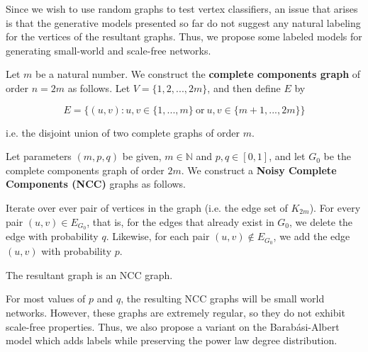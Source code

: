 Since we wish to use random graphs to test vertex classifiers, an issue that
arises is that the generative models presented so far do not suggest any natural
labeling for the vertices of the resultant graphs. Thus, we propose some labeled
models for generating small-world and scale-free networks.

\begin{definition}
  Let $m$ be a natural number. We construct the \textbf{complete components
    graph} of order $n = 2m$ as follows. Let $V = \{1,2, ..., 2m\}$, and then define
  $E$ by

  \[
    E = \{ (u,v) : u,v \in \{1,...,m\} ~\text{or}~ u,v \in \{m+1,...,2m\} \}
  \]

  i.e. the disjoint union of two complete graphs of order $m$.
\end{definition}

\begin{definition}
  Let parameters $(m,p,q)$ be given, $m \in \mathbb{N}$ and $p,q \in [0,1]$, and
  let $G_0$ be the complete components graph of order $2m$. We construct a
  \textbf{Noisy Complete Components (NCC)} graphs as follows.

  Iterate over ever pair of vertices in the graph (i.e. the edge set of
  $K_{2m}$). For every pair $(u,v) \in E_{G_0}$, that is, for the edges that
  already exist in $G_0$, we delete the edge with probability $q$. Likewise, for
  each pair $(u,v) \notin E_{G_0}$, we add the edge $(u,v)$ with probability
  $p$.

  The resultant graph is an NCC graph.
\end{definition}

For most values of $p$ and $q$, the resulting NCC graphs will be small world
networks. However, these graphs are extremely regular, so they do not exhibit
scale-free properties. Thus, we also propose a variant on the Barab\'asi-Albert
model which adds labels while preserving the power law degree distribution.



